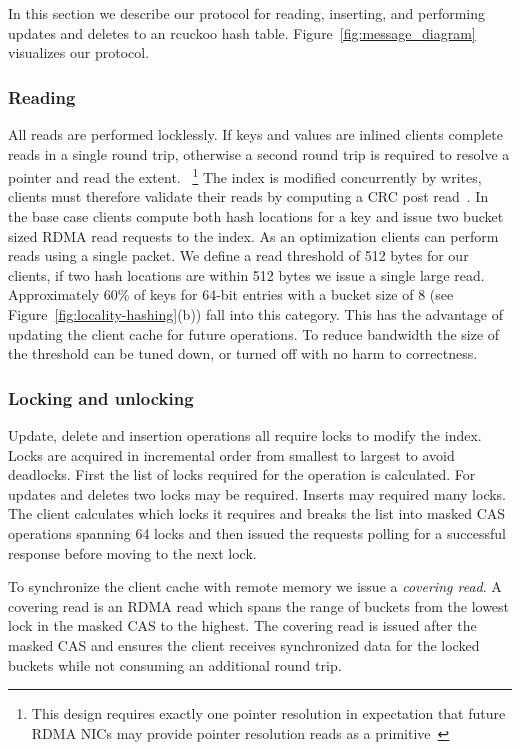 In this section we describe our protocol for reading,
inserting, and performing updates and deletes to an rcuckoo
hash table. Figure~\ref{fig:message_diagram} visualizes our
protocol.

\subsubsection{Reading} 
\label{sec:reading}
All reads are performed locklessly.
If keys and values are inlined clients complete reads in a
single round trip, otherwise a second round trip is required
to resolve a pointer and read the extent. 
~\footnote{This design requires exactly one pointer
resolution in expectation that future RDMA NICs may provide
pointer resolution reads as a primitive~\cite{prism}}
The index is modified concurrently by writes, clients must
therefore validate their reads by computing a CRC post
read~\cite{pilaf,cell}.
In the base case clients compute both hash locations for a
key and issue two bucket sized RDMA read requests to the
index. As an optimization clients can perform reads using a
single packet. We define a read threshold of 512 bytes for
our clients, if two hash locations are within 512 bytes we
issue a single large read.  Approximately 60\% of keys for
64-bit entries with a bucket size of 8 (see
Figure~\ref{fig:locality-hashing}(b)) fall into this
category. This has the advantage of updating the client
cache for future operations.
To reduce bandwidth the size
of the threshold can be tuned down, or turned off with no
harm to correctness.

\subsubsection{Locking and unlocking}

Update, delete and insertion operations all require locks to
modify the index. Locks are acquired in incremental order
from smallest to largest to avoid deadlocks. First the list
of locks required for the operation is calculated. For
updates and deletes two locks may be required. Inserts may
required many locks. The client calculates which locks it
requires and breaks the list into masked CAS operations
spanning 64 locks and then issued the requests polling for a
successful response before moving to the next lock.

To synchronize the client cache with remote memory we issue
a \textit{covering read}. A covering read is an RDMA read
which spans the range of buckets from the lowest lock in the
masked CAS to the highest. The covering read is issued after
the masked CAS and ensures the client receives synchronized
data for the locked buckets while not consuming an
additional round trip.

